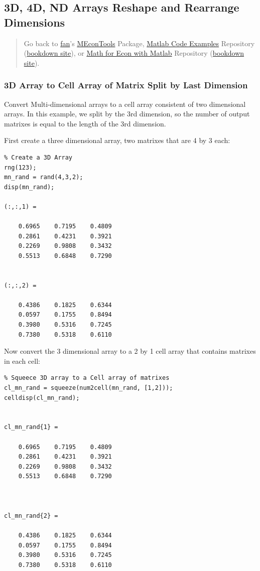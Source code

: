 \documentclass[
]{book}
\begin{document}
\hypertarget{d-4d-nd-arrays-reshape-and-rearrange-dimensions}{%
\subsection{3D, 4D, ND Arrays Reshape and Rearrange Dimensions}\label{d-4d-nd-arrays-reshape-and-rearrange-dimensions}}

\begin{quote}
Go back to \href{http://fanwangecon.github.io/}{fan}'s \href{https://fanwangecon.github.io/MEconTools/}{MEconTools} Package, \href{https://fanwangecon.github.io/M4Econ/}{Matlab Code Examples} Repository (\href{https://fanwangecon.github.io/M4Econ/bookdown}{bookdown site}), or \href{https://fanwangecon.github.io/Math4Econ/}{Math for Econ with Matlab} Repository (\href{https://fanwangecon.github.io/Math4Econ/bookdown}{bookdown site}).
\end{quote}

\hypertarget{d-array-to-cell-array-of-matrix-split-by-last-dimension}{%
\subsubsection{3D Array to Cell Array of Matrix Split by Last Dimension}\label{d-array-to-cell-array-of-matrix-split-by-last-dimension}}

Convert Multi-dimensional arrays to a cell array consistent of two
dimensional arrays. In this example, we split by the 3rd dimension, so
the number of output matrixes is equal to the length of the 3rd
dimension.

First create a three dimensional array, two matrixes that are 4 by 3
each:

\begin{verbatim}
% Create a 3D Array
rng(123);
mn_rand = rand(4,3,2);
disp(mn_rand);

(:,:,1) =

    0.6965    0.7195    0.4809
    0.2861    0.4231    0.3921
    0.2269    0.9808    0.3432
    0.5513    0.6848    0.7290


(:,:,2) =

    0.4386    0.1825    0.6344
    0.0597    0.1755    0.8494
    0.3980    0.5316    0.7245
    0.7380    0.5318    0.6110
\end{verbatim}

Now convert the 3 dimensional array to a 2 by 1 cell array that contains
matrixes in each cell:

\begin{verbatim}
% Squeece 3D array to a Cell array of matrixes
cl_mn_rand = squeeze(num2cell(mn_rand, [1,2]));
celldisp(cl_mn_rand);


cl_mn_rand{1} =
 
    0.6965    0.7195    0.4809
    0.2861    0.4231    0.3921
    0.2269    0.9808    0.3432
    0.5513    0.6848    0.7290



cl_mn_rand{2} =
 
    0.4386    0.1825    0.6344
    0.0597    0.1755    0.8494
    0.3980    0.5316    0.7245
    0.7380    0.5318    0.6110
\end{verbatim}
\end{document}
